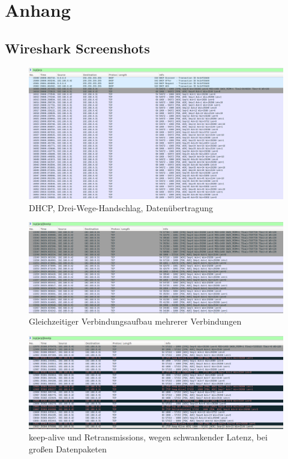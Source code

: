 
\chapter{Anhang}

\section{Wireshark Screenshots}
\begin{figure}[h]
	\centering
	\includegraphics[width=1\textwidth]{Graphics/dhcpHD.png}
	\caption{DHCP, Drei-Wege-Handschlag, Datenübertragung}
	\label{DHCP}
	
\end{figure}

\begin{figure}[h]
	\centering
	\includegraphics[width=1\textwidth]{Graphics/MTCon.png}
	\caption{Gleichzeitiger Verbindungsaufbau mehrerer Verbindungen}
	\label{Multithread}
\end{figure}

\begin{figure}[h]
	\centering
	\includegraphics[width=1\textwidth]{Graphics/latency.png}
	\caption{keep-alive und Retransmissions, wegen schwankender Latenz, bei großen Datenpaketen}
	\label{ret}
\end{figure}